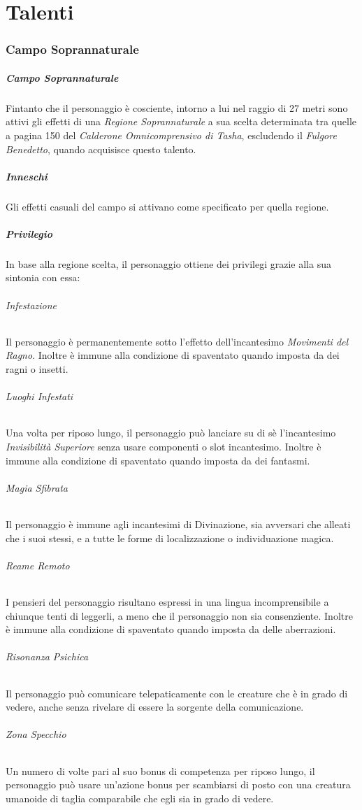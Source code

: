 \chapter{Talenti}


\subsection{Campo Soprannaturale}
\paragraph{Campo Soprannaturale} Fintanto che il personaggio è cosciente, intorno a lui nel raggio di 27 metri sono attivi gli effetti di una \textit{Regione Soprannaturale} a sua scelta determinata tra quelle a pagina 150 del \textit{Calderone Omnicomprensivo di Tasha}, escludendo il \textit{Fulgore Benedetto}, quando acquisisce questo talento.
\paragraph{Inneschi} Gli effetti casuali del campo si attivano come specificato per quella regione.
\paragraph{Privilegio} In base alla regione scelta, il personaggio ottiene dei privilegi grazie alla sua sintonia con essa:
\subparagraph*{Infestazione} Il personaggio è permanentemente sotto l'effetto dell'incantesimo \textit{Movimenti del Ragno}. Inoltre è immune alla condizione di spaventato quando imposta da dei ragni o insetti.\\
\subparagraph*{Luoghi Infestati} Una volta per riposo lungo, il personaggio può lanciare su di sè l'incantesimo \textit{Invisibilità Superiore} senza usare componenti o slot incantesimo. Inoltre è immune alla condizione di spaventato quando imposta da dei fantasmi.\\
\subparagraph*{Magia Sfibrata} Il personaggio è immune agli incantesimi di Divinazione, sia avversari che alleati che i suoi stessi, e a tutte le forme di localizzazione o individuazione magica.\\
\subparagraph{Reame Remoto} I pensieri del personaggio risultano espressi in una lingua incomprensibile a chiunque tenti di leggerli, a meno che il personaggio non sia consenziente. Inoltre è immune alla condizione di spaventato quando imposta da delle aberrazioni.\\
\subparagraph*{Risonanza Psichica} Il personaggio può comunicare telepaticamente con le creature che è in grado di vedere, anche senza rivelare di essere la sorgente della comunicazione.\\
\subparagraph*{Zona Specchio} Un numero di volte pari al suo bonus di competenza per riposo lungo, il personaggio può usare un'azione bonus per scambiarsi di posto con una creatura umanoide di taglia comparabile che egli sia in grado di vedere.\\
